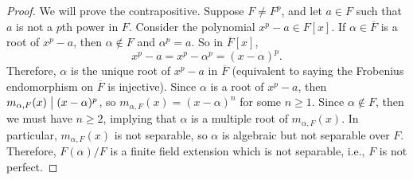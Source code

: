 \documentclass[12pt]{article}
\theoremstyle{definition}
\newcommand{\clo}{\overline}
\newcommand{\divides}{\bigm|}
\begin{document}
\begin{proof}
    We will prove the contrapositive. Suppose $F \ne F^p$, and let $a \in F$ such that $a$ is not a $p$th power in $F$. Consider the polynomial $x^p - a \in F[x]$. If $\alpha \in \clo{F}$ is a root of $x^p - a$, then $\alpha \notin F$ and $\alpha^p = a$. So in $\clo{F}[x]$,
    \[
        x^p - a = x^p - \alpha^p = (x - \alpha)^p.
    \]
    Therefore, $\alpha$ is the unique root of $x^p - a$ in $\clo{F}$ (equivalent to saying the Frobenius endomorphism on $\clo{F}$ is injective). Since $\alpha$ is a root of $x^p - a$, then $m_{\alpha, F}(x) \divides (x - \alpha)^p$, so $m_{\alpha, F}(x) = (x - \alpha)^n$ for some $n \geq 1$. Since $\alpha \notin F$, then we must have $n \geq 2$, implying that $\alpha$ is a multiple root of $m_{\alpha, F}(x)$. In particular, $m_{\alpha, F}(x)$ is not separable, so $\alpha$ is algebraic but not separable over $F$. Therefore, $F(\alpha)/F$ is a finite field extension which is not separable, i.e., $F$ is not perfect.


\end{proof}
\end{document}
